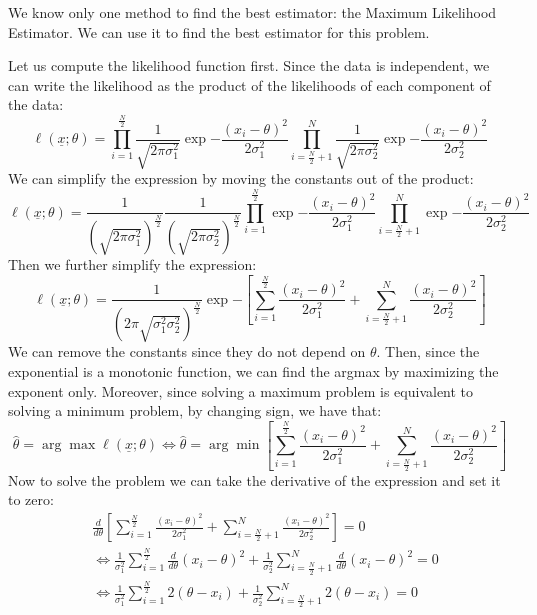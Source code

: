 We know only one method to find the best estimator: the Maximum Likelihood Estimator. We can use it to find the best estimator for this problem.

Let us compute the likelihood function first. Since the data is independent, we can write the likelihood as the product of the likelihoods of each component of the data:
\[
    \ell(\underline x;\theta) = \prod_{i=1}^{\frac{N}{2}} \frac{1}{\sqrt{2\pi\sigma_1^2}} \exp{-\frac{(x_i - \theta)^2}{2\sigma_1^2}} \prod_{i=\frac{N}{2}+1}^{N} \frac{1}{\sqrt{2\pi\sigma_2^2}} \exp{-\frac{(x_i - \theta)^2}{2\sigma_2^2}}
\]
We can simplify the expression by moving the constants out of the product:
\[
    \ell(\underline x;\theta) = \frac{1}{\left(\sqrt{2\pi\sigma_1^2}\right)^{\frac{N}{2}}}  \frac{1}{\left(\sqrt{2\pi\sigma_2^2}\right)^{\frac {N}{2}}}  \prod_{i=1}^{\frac{N}{2}} \exp{-\frac{(x_i - \theta)^2}{2\sigma_1^2}} \prod_{i=\frac{N}{2}+1}^{N}\exp{-\frac{(x_i - \theta)^2}{2\sigma_2^2}}
\]
Then we further simplify the expression:
\[
    \ell(\underline x;\theta) = \frac{1}{\left(2\pi\sqrt{\sigma_1^2\sigma_2^2}\right)^{\frac{N}{2}}} \exp{ - \left[\sum_{i=1}^{\frac{N}{2}} \frac{(x_i - \theta)^2}{2\sigma_1^2} + \sum_{i=\frac{N}{2} + 1}^{N} \frac{(x_i - \theta)^2}{2\sigma_2^2}\right]}
\]
We can remove the constants since they do not depend on $\theta$. Then, since the exponential is a monotonic function, we can find the argmax by maximizing the exponent only. Moreover, since solving a maximum problem is equivalent to solving a minimum problem, by changing sign, we have that:
\[
    \hat{\theta} = \arg\max \ell(\underline x; \theta) \iff \hat{\theta} = \arg\min \left[\sum_{i=1}^{\frac{N}{2}} \frac{(x_i - \theta)^2}{2\sigma_1^2} + \sum_{i=\frac{N}{2} + 1}^{N} \frac{(x_i - \theta)^2}{2\sigma_2^2}\right]
\]
Now to solve the problem we can take the derivative of the expression and set it to zero:
\begin{align*}
     & \frac{d}{d\theta} \left[\sum_{i=1}^{\frac{N}{2}} \frac{(x_i - \theta)^2}{2\sigma_1^2} + \sum_{i=\frac{N}{2} + 1}^{N} \frac{(x_i - \theta)^2}{2\sigma_2^2}\right] = 0                      \\
     & \Leftrightarrow \frac{1}{\sigma_1^2} \sum_{i=1}^{\frac{N}{2}} \frac{d}{d\theta}(x_i - \theta)^2 + \frac{1}{\sigma_2^2} \sum_{i=\frac{N}{2} + 1}^{N} \frac{d}{d\theta}(x_i - \theta)^2 = 0 \\
     & \Leftrightarrow \frac{1}{\sigma_1^2} \sum_{i=1}^{\frac{N}{2}} 2(\theta -x_i) + \frac{1}{\sigma_2^2} \sum_{i=\frac{N}{2} + 1}^{N} 2(\theta - x_i) = 0
\end{align*}
